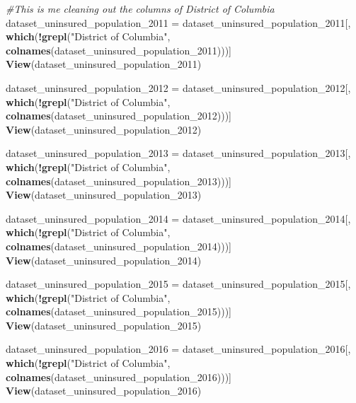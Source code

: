 \documentclass[
]{article}
\newenvironment{Shaded}{\begin{snugshade}}{\end{snugshade}}
\newcommand{\CommentTok}[1]{\textcolor[rgb]{0.56,0.35,0.01}{\textit{#1}}}
\newcommand{\FunctionTok}[1]{\textcolor[rgb]{0.13,0.29,0.53}{\textbf{#1}}}
\newcommand{\NormalTok}[1]{#1}
\newcommand{\OtherTok}[1]{\textcolor[rgb]{0.56,0.35,0.01}{#1}}
\newcommand{\SpecialCharTok}[1]{\textcolor[rgb]{0.81,0.36,0.00}{\textbf{#1}}}
\newcommand{\StringTok}[1]{\textcolor[rgb]{0.31,0.60,0.02}{#1}}
\begin{document}
\begin{Shaded}
\begin{Highlighting}[]
\CommentTok{\#This is me cleaning out the columns of District of Columbia}
\NormalTok{dataset\_uninsured\_population\_2011 }\OtherTok{=}\NormalTok{ dataset\_uninsured\_population\_2011[, }\FunctionTok{which}\NormalTok{(}\SpecialCharTok{!}\FunctionTok{grepl}\NormalTok{(}\StringTok{"District of Columbia"}\NormalTok{, }\FunctionTok{colnames}\NormalTok{(dataset\_uninsured\_population\_2011)))]}
\FunctionTok{View}\NormalTok{(dataset\_uninsured\_population\_2011)}

\NormalTok{dataset\_uninsured\_population\_2012 }\OtherTok{=}\NormalTok{ dataset\_uninsured\_population\_2012[, }\FunctionTok{which}\NormalTok{(}\SpecialCharTok{!}\FunctionTok{grepl}\NormalTok{(}\StringTok{"District of Columbia"}\NormalTok{, }\FunctionTok{colnames}\NormalTok{(dataset\_uninsured\_population\_2012)))]}
\FunctionTok{View}\NormalTok{(dataset\_uninsured\_population\_2012)}

\NormalTok{dataset\_uninsured\_population\_2013 }\OtherTok{=}\NormalTok{ dataset\_uninsured\_population\_2013[, }\FunctionTok{which}\NormalTok{(}\SpecialCharTok{!}\FunctionTok{grepl}\NormalTok{(}\StringTok{"District of Columbia"}\NormalTok{, }\FunctionTok{colnames}\NormalTok{(dataset\_uninsured\_population\_2013)))]}
\FunctionTok{View}\NormalTok{(dataset\_uninsured\_population\_2013)}

\NormalTok{dataset\_uninsured\_population\_2014 }\OtherTok{=}\NormalTok{ dataset\_uninsured\_population\_2014[, }\FunctionTok{which}\NormalTok{(}\SpecialCharTok{!}\FunctionTok{grepl}\NormalTok{(}\StringTok{"District of Columbia"}\NormalTok{, }\FunctionTok{colnames}\NormalTok{(dataset\_uninsured\_population\_2014)))]}
\FunctionTok{View}\NormalTok{(dataset\_uninsured\_population\_2014)}

\NormalTok{dataset\_uninsured\_population\_2015 }\OtherTok{=}\NormalTok{ dataset\_uninsured\_population\_2015[, }\FunctionTok{which}\NormalTok{(}\SpecialCharTok{!}\FunctionTok{grepl}\NormalTok{(}\StringTok{"District of Columbia"}\NormalTok{, }\FunctionTok{colnames}\NormalTok{(dataset\_uninsured\_population\_2015)))]}
\FunctionTok{View}\NormalTok{(dataset\_uninsured\_population\_2015)}

\NormalTok{dataset\_uninsured\_population\_2016 }\OtherTok{=}\NormalTok{ dataset\_uninsured\_population\_2016[, }\FunctionTok{which}\NormalTok{(}\SpecialCharTok{!}\FunctionTok{grepl}\NormalTok{(}\StringTok{"District of Columbia"}\NormalTok{, }\FunctionTok{colnames}\NormalTok{(dataset\_uninsured\_population\_2016)))]}
\FunctionTok{View}\NormalTok{(dataset\_uninsured\_population\_2016)}


\end{Highlighting}
\end{Shaded}
\end{document}
